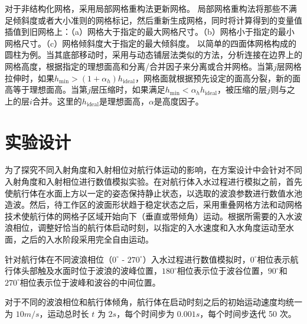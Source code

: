 对于非结构化网格，采用局部网格重构法更新网格。
局部网格重构法将那些不满足倾斜度或者大小准则的网格标记，然后重新生成网格，同时将计算得到的变量值插值到旧网格上：（a）网格大于指定的最大网格尺寸。（b）网格小于指定的最小网格尺寸。（c）网格倾斜度大于指定的最大倾斜度。
以简单的四面体网格构成的圆柱为例。当其底部移动时，采用与动态铺层法类似的方法，分析连接在边界上的网格高度，根据指定的理想面高和分离/合并因子来分离或合并网格。当第$j$层网格拉伸时，如果$h_{\min} > (1 + \alpha_h) h_{\mathrm{ideal}}$，网格面就根据预先设定的面高分裂，新的面高等于理想面高。当第$j$层压缩时，如果满足$h_{\min} < \alpha _h h_{\mathrm{ideal}}$，被压缩的层$j$则与之上的层$i$合并。这里的$h_{\mathrm{ideal}}$是理想面高，$\alpha$是高度因子。

\section{实验设计}

为了探究不同入射角度和入射相位对航行体运动的影响，在方案设计中会针对不同入射角度和入射相位进行数值模拟实验。在对航行体入水过程进行模拟之前，首先使航行体在水面上方以一定的姿态保持静止状态，以选取的波浪参数进行数值水池造波。然后，待工作区的波面形状趋于稳定状态之后，采用重叠网格方法和动网格技术使航行体的网格子区域开始向下（垂直或带倾角）运动。根据所需要的入水波浪相位，调整好恰当的航行体启动时刻，以指定的入水速度和入水角度运动至水面，之后的入水阶段采用完全自由运动。

针对航行体在不同波浪相位（$0 ^\circ$ - $270 ^\circ$）入水过程进行数值模拟时，$0^\circ$相位表示航行体头部触及水面时位于波浪的波峰位置，$180^\circ$相位表示位于波谷位置，$90^\circ$和$270^\circ$相位表示位于波峰和波谷的中间位置。

对于不同的波浪相位和航行体倾角，航行体在启动时刻之后的初始运动速度均统一为 $10 m/s$，运动总时长 $t$ 为 $2s$，每个时间步为 $0.001s$，每个时间步迭代 50 次。